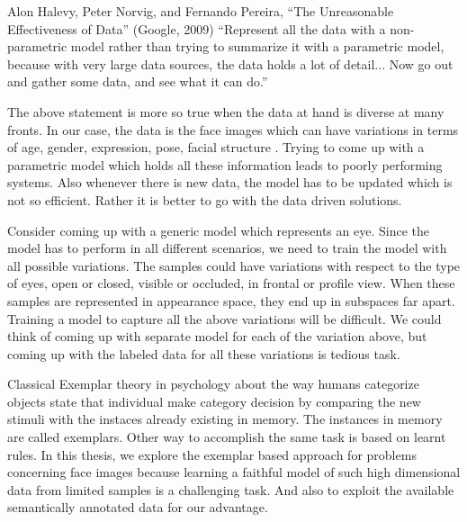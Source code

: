 
\begin{chapquote}{
Alon Halevy, Peter Norvig, and Fernando Pereira,
“The Unreasonable Effectiveness of Data” (Google, 2009)
}
“Represent all the data with a non-parametric model rather than trying to
summarize it with a parametric model, because with very large data sources, the
data holds a lot of detail... Now go out and gather some data, and see what it can
do.”
\end{chapquote}

The above statement is more so true when the data at hand is diverse at many fronts. In our case, 
the data is the face images which can have variations in terms of age, gender, expression, pose, 
facial structure \etc. Trying to come up with a parametric model which holds all these information
leads to poorly performing systems. Also whenever there is new data, the model has to be updated
which is not so efficient. Rather it is better to go with the data driven solutions.

Consider coming up with a generic model which represents an eye. Since the model has to perform
in all different scenarios, we need to train the model with all possible variations. The samples
could have variations with respect to the type of eyes, open or closed, visible or occluded, in 
frontal or profile view. When these samples are represented in appearance space, they end up in 
subspaces far apart. Training a model to capture all the above variations will be difficult. We
could think of coming up with separate model for each of the variation above, but coming up with 
the labeled data for all these variations is tedious task. 

Classical Exemplar theory in psychology about the way humans categorize objects state that individual
make category decision by comparing the new stimuli with the instaces already existing in memory.
The instances in memory are called exemplars. Other way to accomplish the same task is based 
on learnt rules. In this thesis, we explore the exemplar based approach for problems concerning 
face images because learning a faithful model of such high dimensional data from limited samples
is a challenging task. And also to exploit the available semantically annotated data for our advantage.

